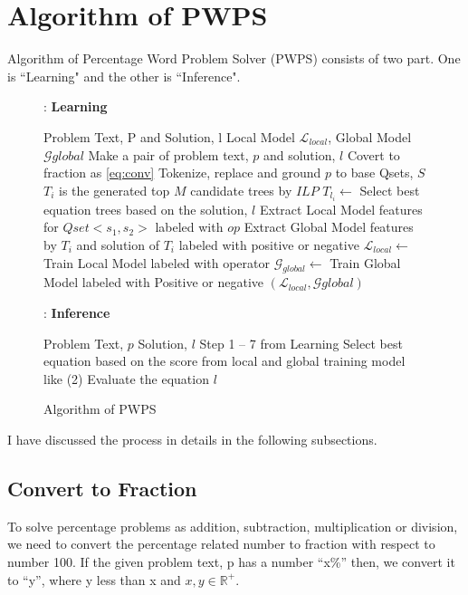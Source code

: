 \documentclass[document.tex]{subfiles}
\begin{document}
\section{Algorithm of PWPS}
Algorithm of Percentage Word Problem Solver (PWPS) consists of two part. One is ``Learning" and the other is ``Inference".
\begin{figure}[H]
	\begin{algorithm}[H]
		\caption{: \textbf{Learning}}
		\begin{algorithmic}[1]
			\renewcommand{\algorithmicrequire}{\textbf{Input:}}
			\renewcommand{\algorithmicensure}{\textbf{Output:}}
			\REQUIRE Problem Text, P and Solution, l
			\ENSURE  Local Model $\mathcal{L}_{local}$, Global Model $ \mathcal{G}{global}$
			\STATE Make a pair of problem text, $p$ and solution, $l$
			\STATE Covert to fraction as \ref{eq:conv}
			\STATE Tokenize, replace and ground $p$ to base Qsets, $S$
			\STATE $T_{i}$  is the generated top $M$ candidate trees by $ILP$
			\STATE $T_{l_i} \leftarrow$ Select best equation trees based on the solution, $l$
			\STATE Extract Local Model features for $Qset <s_1, s_2>$ labeled with $op$
			\STATE Extract Global Model features by $T_i$  and solution of $T_i$ labeled with positive or negative
			\ENDFOR
			\STATE $\mathcal{L}_{local} \leftarrow$  Train Local Model labeled with operator
			\STATE $\mathcal{G}_{global} \leftarrow$  Train Global Model labeled with Positive or negative
			\RETURN $( \mathcal{L}_{local}, \mathcal{G}{global} )$
		\end{algorithmic}
	\end{algorithm}
	\begin{algorithm}[H]
		\caption{: \textbf{Inference}}
		\begin{algorithmic}[1]
			\renewcommand{\algorithmicrequire}{\textbf{Input:}}
			\renewcommand{\algorithmicensure}{\textbf{Output:}}
			\REQUIRE Problem Text, $p$
			\ENSURE  Solution, $l$
			\STATE Step 1 -- 7 from Learning
			\STATE Select best equation based on the score from local and global training model like (2)
			\STATE Evaluate the equation
			\RETURN $l$
		\end{algorithmic}
	\end{algorithm}
	\caption{Algorithm of PWPS}
	\label{fig:algo}
\end{figure}
I have discussed the process in details in the following subsections.

\subsection{Convert to Fraction}
\noindent To solve percentage problems as addition, subtraction, multiplication or division, we need to convert the percentage related number to fraction with respect to number 100. If the given problem text, p has a number “x\%” then, we convert it to “y”, where y less than x and $x, y \in \mathbb{R^+}$.
\end{document}
